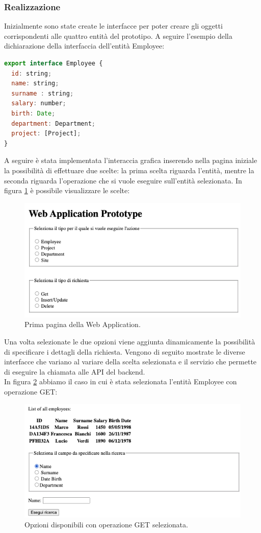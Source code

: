 \subsubsection*{Realizzazione}
Inizialmente sono state create le interfacce per poter creare gli oggetti corrispondenti alle quattro entità del prototipo. A seguire l'esempio della dichiarazione della interfaccia dell'entità Employee:
\begin{lstlisting}[language=JavaScript, title={object.ts}]
export interface Employee {
  id: string;
  name: string;
  surname : string;
  salary: number;
  birth: Date;
  department: Department;
  project: [Project];
}
\end{lstlisting}
A seguire è stata implementata l'interaccia grafica inserendo nella pagina iniziale la possibilità di effettuare due scelte: la prima scelta riguarda l'entità, mentre la seconda riguarda l'operazione che si vuole eseguire sull'entità selezionata. In figura \ref{first-page} è possibile visualizzare le scelte:
\FloatBarrier
\begin{figure}[!ht]
\centering
\includegraphics[width=0.7\linewidth]{immagini/firstPage.png}
\caption{Prima pagina della Web Application.}
\label{first-page}
\end{figure}
\FloatBarrier
Una volta selezionate le due opzioni viene aggiunta dinamicamente la possibilità di specificare i dettagli della richiesta. Vengono di seguito mostrate le diverse interfacce che variano al variare della scelta selezionata e il servizio che permette di eseguire la chiamata alle API del backend.\\
In figura \ref{get-employee} abbiamo il caso in cui è stata selezionata l'entità Employee con operazione GET:
\FloatBarrier
\begin{figure}[!ht]
\centering
\includegraphics[width=0.7\linewidth]{immagini/getEmployee.png}
\caption{Opzioni disponibili con operazione GET selezionata.}
\label{get-employee}
\end{figure}
